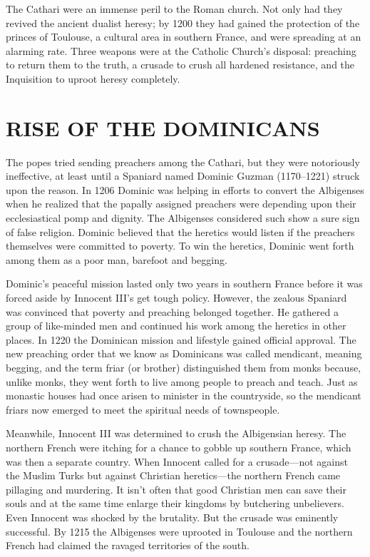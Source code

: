 The Cathari were an immense peril to the Roman church. Not only had they revived the ancient dualist
heresy; by 1200 they had gained the protection of the princes of Toulouse, a cultural area in
southern France, and were spreading at an alarming rate. Three weapons were at the Catholic Church’s
disposal: preaching to return them to the truth, a crusade to crush all hardened resistance, and the
Inquisition to uproot heresy completely.

\section{RISE OF THE DOMINICANS}

The popes tried sending preachers among the Cathari, but they were notoriously ineffective, at least
until a Spaniard named Dominic Guzman (1170–1221) struck upon the reason. In 1206 Dominic was
helping in efforts to convert the Albigenses when he realized that the papally assigned preachers
were depending upon their ecclesiastical pomp and dignity. The Albigenses considered such show a
sure sign of false religion. Dominic believed that the heretics would listen if the preachers
themselves were committed to poverty. To win the heretics, Dominic went forth among them as a poor
man, barefoot and begging.

Dominic’s peaceful mission lasted only two years in southern France before it was forced aside by
Innocent III’s get tough policy. However, the zealous Spaniard was convinced that poverty and
preaching belonged together. He gathered a group of like-minded men and continued his work among the
heretics in other places. In 1220 the Dominican mission and lifestyle gained official approval. The
new preaching order that we know as Dominicans was called mendicant, meaning begging, and the term
friar (or brother) distinguished them from monks because, unlike monks, they went forth to live
among people to preach and teach. Just as monastic houses had once arisen to minister in the
countryside, so the mendicant friars now emerged to meet the spiritual needs of townspeople.

Meanwhile, Innocent III was determined to crush the Albigensian heresy. The northern French were
itching for a chance to gobble up southern France, which was then a separate country. When Innocent
called for a crusade—not against the Muslim Turks but against Christian heretics—the northern French
came pillaging and murdering. It isn’t often that good Christian men can save their souls and at the
same time enlarge their kingdoms by butchering unbelievers. Even Innocent was shocked by the
brutality. But the crusade was eminently successful. By 1215 the Albigenses were uprooted in
Toulouse and the northern French had claimed the ravaged territories of the south.

